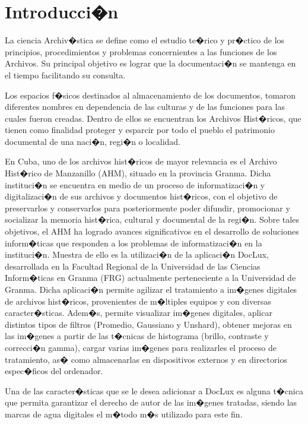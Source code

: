 \documentclass{rcci} %
\begin{document}
\onehalfspacing
\parskip=12pt
\section{Introducci�n}

La ciencia Archiv�stica se define como el estudio te�rico y pr�ctico de los principios, procedimientos y problemas concernientes a las funciones de los Archivos. Su principal
objetivo es lograr que la documentaci�n se mantenga en el tiempo facilitando su consulta.

Los espacios f�sicos destinados al almacenamiento de los documentos, tomaron diferentes nombres en dependencia de las culturas y de las funciones para las cuales
fueron creadas. Dentro de ellos se encuentran los Archivos Hist�ricos, que tienen como finalidad proteger y esparcir por todo el pueblo el patrimonio documental de una naci�n,
regi�n o localidad.

En Cuba, uno de los archivos hist�ricos de mayor relevancia es el Archivo Hist�rico de Manzanillo (AHM), situado en la provincia Granma. Dicha instituci�n se encuentra en medio de un proceso de informatizaci�n y digitalizaci�n de sus archivos y documentos hist�ricos,
con el objetivo de preservarlos y conservarlos para posteriormente poder difundir, promocionar y socializar la memoria hist�rica, cultural y documental de la regi�n.
Sobre tales objetivos, el AHM ha logrado avances significativos en el desarrollo de soluciones inform�ticas que responden a los problemas de informatizaci�n
en la instituci�n. Muestra de ello es la utilizaci�n de la aplicaci�n DocLux, desarrollada en la Facultad Regional de la Universidad
de las Ciencias Inform�ticas en Granma (FRG) actualmente perteneciente a la Universidad de Granma. Dicha aplicaci�n permite agilizar el tratamiento a im�genes digitales de
archivos hist�ricos, provenientes de m�ltiples equipos y con diversas caracter�sticas. Adem�s, permite visualizar im�genes digitales,
aplicar distintos tipos de filtros (Promedio, Gaussiano y Unshard), obtener mejoras en las im�genes a partir de las t�cnicas de histograma (brillo, contraste y correcci�n gamma),
cargar varias im�genes para realizarles el proceso de tratamiento, as� como almacenarlas en dispositivos externos y en directorios espec�ficos
del ordenador.

Una de las caracter�sticas que se le desea adicionar a DocLux es alguna t�cnica que permita garantizar el derecho de autor de las im�genes tratadas, siendo las marcas de agua
digitales el m�todo m�s utilizado para este fin.
\end{document}
